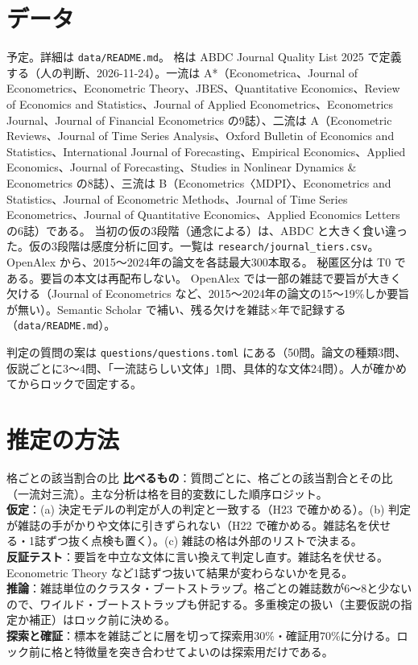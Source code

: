 \documentclass[a4paper,10pt]{ltjsarticle}
\begin{document}
\section{データ}\label{sec:data}
予定。詳細は \texttt{data/README.md}。
格は ABDC Journal Quality List 2025 で定義する（人の判断、2026-11-24）。一流は A*（Econometrica、Journal of Econometrics、Econometric Theory、JBES、Quantitative Economics、Review of Economics and Statistics、Journal of Applied Econometrics、Econometrics Journal、Journal of Financial Econometrics の9誌）、二流は A（Econometric Reviews、Journal of Time Series Analysis、Oxford Bulletin of Economics and Statistics、International Journal of Forecasting、Empirical Economics、Applied Economics、Journal of Forecasting、Studies in Nonlinear Dynamics \& Econometrics の8誌）、三流は B（Econometrics〈MDPI〉、Econometrics and Statistics、Journal of Econometric Methods、Journal of Time Series Econometrics、Journal of Quantitative Economics、Applied Economics Letters の6誌）である。
当初の仮の3段階（通念による）は、ABDC と大きく食い違った。仮の3段階は感度分析に回す。一覧は \texttt{research/journal\_tiers.csv}。
OpenAlex から、2015〜2024年の論文を各誌最大300本取る。
秘匿区分は T0 である。要旨の本文は再配布しない。
OpenAlex では一部の雑誌で要旨が大きく欠ける（Journal of Econometrics など、2015〜2024年の論文の15〜19\%しか要旨が無い）。Semantic Scholar で補い、残る欠けを雑誌×年で記録する（\texttt{data/README.md}）。

判定の質問の案は \texttt{questions/questions.toml} にある（50問。論文の種類3問、仮説ごとに3〜4問、「一流誌らしい文体」1問、具体的な文体24問）。人が確かめてからロックで固定する。

\section{推定の方法}\label{sec:design}
\begin{design}{格ごとの該当割合の比}
\textbf{比べるもの}：質問ごとに、格ごとの該当割合とその比（一流対三流）。主な分析は格を目的変数にした順序ロジット。\\
\textbf{仮定}：(a) 決定モデルの判定が人の判定と一致する（H23 で確かめる）。(b) 判定が雑誌の手がかりや文体に引きずられない（H22 で確かめる。雑誌名を伏せる・1誌ずつ抜く点検も置く）。(c) 雑誌の格は外部のリストで決まる。\\
\textbf{反証テスト}：要旨を中立な文体に言い換えて判定し直す。雑誌名を伏せる。Econometric Theory など1誌ずつ抜いて結果が変わらないかを見る。\\
\textbf{推論}：雑誌単位のクラスタ・ブートストラップ。格ごとの雑誌数が6〜8と少ないので、ワイルド・ブートストラップも併記する。多重検定の扱い（主要仮説の指定か補正）はロック前に決める。\\
\textbf{探索と確証}：標本を雑誌ごとに層を切って探索用30\%・確証用70\%に分ける。ロック前に格と特徴量を突き合わせてよいのは探索用だけである。
\end{design}
\end{document}
